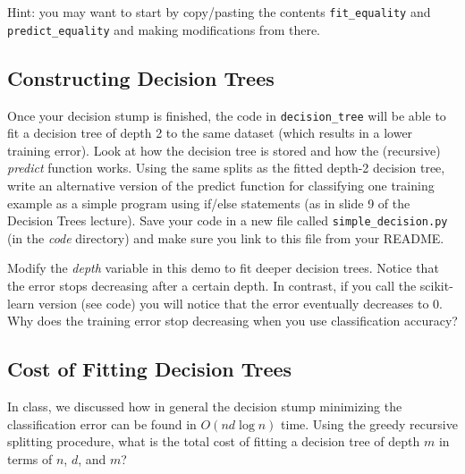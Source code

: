 \documentclass{article}
\def\blu#1{{\color{blu}#1}}
\begin{document}
Hint: you may want to start by copy/pasting the contents \texttt{fit\string_equality} and \texttt{predict\string_equality} and making modifications from there. %


\subsection{Constructing Decision Trees}

Once your decision stump is finished, the code in \texttt{decision\string_tree} will be able to fit a decision tree of depth 2 to the same dataset (which results in a lower training error). Look at how the decision tree is stored and how the (recursive) \emph{predict} function works. \blu{Using the same splits as the fitted depth-2 decision tree, write an alternative version of the predict function for classifying one training example as a simple program using if/else statements (as in slide 9 of the Decision Trees lecture).} Save your code in a new file called \texttt{simple\string_decision.py} (in the \emph{code} directory) and make sure you link to this file from your README.


Modify the \emph{depth} variable in this demo to fit deeper decision trees. Notice that the error stops decreasing after a certain depth.
In contrast, if you call the scikit-learn version (see code) you will notice that the error eventually decreases to 0.
\blu{Why does the training error stop decreasing when you use classification accuracy?}


\subsection{Cost of Fitting Decision Trees}

In class, we discussed how in general the decision stump minimizing the classification error can be found in $O(nd\log n)$ time. Using the greedy recursive splitting procedure, \blu{what is the total cost of fitting a decision tree of depth $m$ in terms of $n$, $d$, and $m$?}
\end{document}
